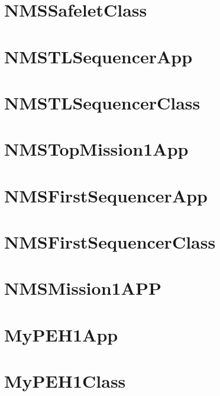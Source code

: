 \documentclass{article}
\begin{document}
%

\section{NMSSafeletClass}

\newpage

\section{NMSTLSequencerApp}

\newpage

\section{NMSTLSequencerClass}

\newpage

\section{NMSTopMission1App}

\newpage

\section{NMSFirstSequencerApp}

\newpage

\section{NMSFirstSequencerClass}

\newpage

\section{NMSMission1APP}

\newpage

\section{MyPEH1App}

\newpage

\section{MyPEH1Class}

\newpage
\end{document}
